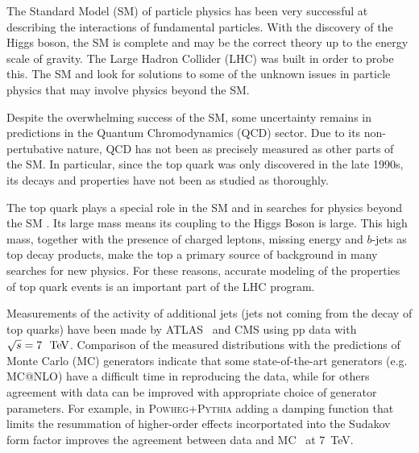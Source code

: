 The Standard Model (SM) of particle physics has been very successful at describing the interactions of fundamental particles. With the discovery of the Higgs boson, the SM is complete and may be the correct theory up to the energy scale of gravity. The Large Hadron Collider (LHC) was built in order to probe this. The SM and look for solutions to some of the unknown issues in particle physics that may involve physics beyond the SM.

Despite the overwhelming success of the SM, some uncertainty remains in predictions in the Quantum Chromodynamics (QCD) sector. Due to its non-pertubative nature, QCD has not been as precisely measured as other parts of the SM. In particular, since the top quark was only discovered in the late 1990s, its decays and properties have not been as studied as thoroughly. 

The top quark plays a special role in the SM and in searches for
physics beyond the SM .  Its large mass means its coupling to the
Higgs Boson is large.  This high mass, together with the presence of 
charged leptons, missing energy and $b$-jets as top decay products,
make the top a primary source of background in many searches for new physics.
For these reasons, accurate modeling of the properties of top quark
events is an important part of the LHC program.

Measurements of the activity of additional jets (jets not coming from the decay of top quarks)
have been made by ATLAS~\cite{gapfraction,hdamp,ljets} and CMS\cite{Chatrchyan:2014gma} using
pp data with $\sqrt{s}=7~\TeV$.  Comparison of the measured distributions with the predictions of Monte Carlo (MC) generators
indicate that some state-of-the-art generators (e.g. \textsc{MC@NLO}) have a difficult time in reproducing the data,
while for others  agreement with data can be improved with appropriate
choice of generator parameters.  For example, in \textsc{Powheg+Pythia} adding a damping
function that limits the resummation of higher-order effects incorportated into  the Sudakov form factor improves
the agreement between data and MC~\cite{hdamp} at 7~TeV.  

